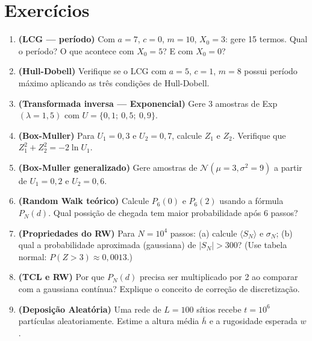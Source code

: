 \documentclass[12pt,a4paper]{article}
\begin{document}
\section{Exerc\'icios}

\begin{enumerate}

\item \textbf{(LCG --- per\'iodo)} Com $a=7$, $c=0$, $m=10$, $X_0=3$: gere 15 termos. Qual o per\'iodo? O que acontece com $X_0=5$? E com $X_0=0$?

\item \textbf{(Hull-Dobell)} Verifique se o LCG com $a=5$, $c=1$, $m=8$ possui per\'iodo m\'aximo aplicando as tr\^es condi\c{c}\~oes de Hull-Dobell.

\item \textbf{(Transformada inversa --- Exponencial)} Gere 3 amostras de Exp$(\lambda=1{,}5)$ com $U = \{0{,}1;\ 0{,}5;\ 0{,}9\}$.

\item \textbf{(Box-Muller)} Para $U_1=0{,}3$ e $U_2=0{,}7$, calcule $Z_1$ e $Z_2$. Verifique que $Z_1^2 + Z_2^2 = -2\ln U_1$.

\item \textbf{(Box-Muller generalizado)} Gere amostras de $\mathcal{N}(\mu=3, \sigma^2=9)$ a partir de $U_1=0{,}2$ e $U_2=0{,}6$.

\item \textbf{(Random Walk te\'orico)} Calcule $P_6(0)$ e $P_6(2)$ usando a f\'ormula $P_N(d)$. Qual possi\c{c}\~ao de chegada tem maior probabilidade ap\'os 6 passos?

\item \textbf{(Propriedades do RW)} Para $N = 10^4$ passos: (a) calcule $\langle S_N \rangle$ e $\sigma_N$; (b) qual a probabilidade aproximada (gaussiana) de $|S_N| > 300$? (Use tabela normal: $P(Z > 3) \approx 0{,}0013$.)

\item \textbf{(TCL e RW)} Por que $P_N(d)$ precisa ser multiplicado por 2 ao comparar com a gaussiana cont\'inua? Explique o conceito de corre\c{c}\~ao de discretiza\c{c}\~ao.

\item \textbf{(Deposi\c{c}\~ao Aleat\'oria)} Uma rede de $L=100$ s\'itios recebe $t=10^6$ part\'iculas aleatoriamente. Estime a altura m\'edia $\bar{h}$ e a rugosidade esperada $w$.


\end{enumerate}
\end{document}
